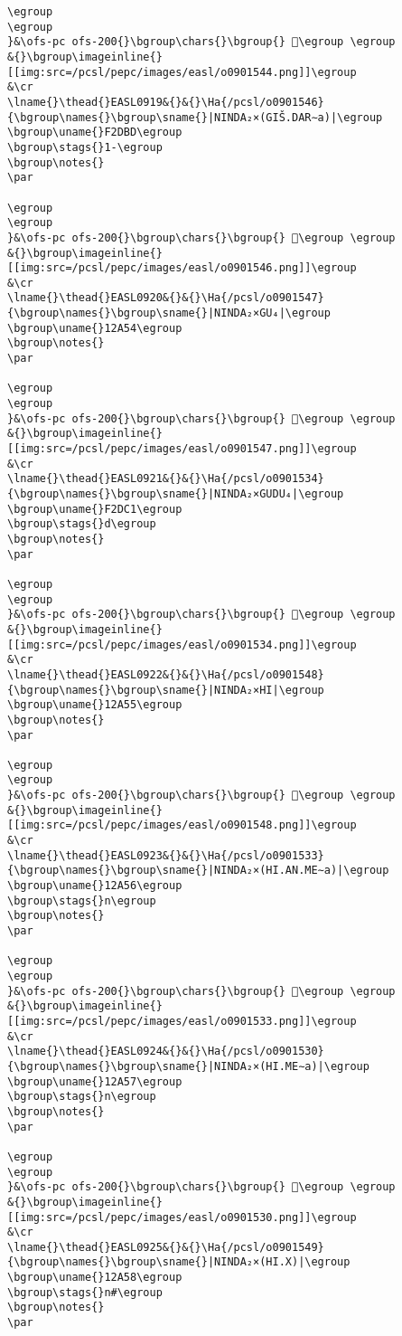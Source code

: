 \begin{verbatim}
\egroup
\egroup
}&\ofs-pc ofs-200{}\bgroup\chars{}\bgroup{} 𒩓\egroup \egroup
&{}\bgroup\imageinline{}[[img:src=/pcsl/pepc/images/easl/o0901544.png]]\egroup
&\cr
\lname{}\thead{}EASL0919&{}&{}\Ha{/pcsl/o0901546}{\bgroup\names{}\bgroup\sname{}|NINDA₂×(GIŠ.DAR∼a)|\egroup
\bgroup\uname{}F2DBD\egroup
\bgroup\stags{}1-\egroup
\bgroup\notes{}
\par 

\egroup
\egroup
}&\ofs-pc ofs-200{}\bgroup\chars{}\bgroup{} 󲶽\egroup \egroup
&{}\bgroup\imageinline{}[[img:src=/pcsl/pepc/images/easl/o0901546.png]]\egroup
&\cr
\lname{}\thead{}EASL0920&{}&{}\Ha{/pcsl/o0901547}{\bgroup\names{}\bgroup\sname{}|NINDA₂×GU₄|\egroup
\bgroup\uname{}12A54\egroup
\bgroup\notes{}
\par 

\egroup
\egroup
}&\ofs-pc ofs-200{}\bgroup\chars{}\bgroup{} 𒩔\egroup \egroup
&{}\bgroup\imageinline{}[[img:src=/pcsl/pepc/images/easl/o0901547.png]]\egroup
&\cr
\lname{}\thead{}EASL0921&{}&{}\Ha{/pcsl/o0901534}{\bgroup\names{}\bgroup\sname{}|NINDA₂×GUDU₄|\egroup
\bgroup\uname{}F2DC1\egroup
\bgroup\stags{}d\egroup
\bgroup\notes{}
\par 

\egroup
\egroup
}&\ofs-pc ofs-200{}\bgroup\chars{}\bgroup{} 󲷁\egroup \egroup
&{}\bgroup\imageinline{}[[img:src=/pcsl/pepc/images/easl/o0901534.png]]\egroup
&\cr
\lname{}\thead{}EASL0922&{}&{}\Ha{/pcsl/o0901548}{\bgroup\names{}\bgroup\sname{}|NINDA₂×HI|\egroup
\bgroup\uname{}12A55\egroup
\bgroup\notes{}
\par 

\egroup
\egroup
}&\ofs-pc ofs-200{}\bgroup\chars{}\bgroup{} 𒩕\egroup \egroup
&{}\bgroup\imageinline{}[[img:src=/pcsl/pepc/images/easl/o0901548.png]]\egroup
&\cr
\lname{}\thead{}EASL0923&{}&{}\Ha{/pcsl/o0901533}{\bgroup\names{}\bgroup\sname{}|NINDA₂×(HI.AN.ME∼a)|\egroup
\bgroup\uname{}12A56\egroup
\bgroup\stags{}n\egroup
\bgroup\notes{}
\par 

\egroup
\egroup
}&\ofs-pc ofs-200{}\bgroup\chars{}\bgroup{} 𒩖\egroup \egroup
&{}\bgroup\imageinline{}[[img:src=/pcsl/pepc/images/easl/o0901533.png]]\egroup
&\cr
\lname{}\thead{}EASL0924&{}&{}\Ha{/pcsl/o0901530}{\bgroup\names{}\bgroup\sname{}|NINDA₂×(HI.ME∼a)|\egroup
\bgroup\uname{}12A57\egroup
\bgroup\stags{}n\egroup
\bgroup\notes{}
\par 

\egroup
\egroup
}&\ofs-pc ofs-200{}\bgroup\chars{}\bgroup{} 𒩗\egroup \egroup
&{}\bgroup\imageinline{}[[img:src=/pcsl/pepc/images/easl/o0901530.png]]\egroup
&\cr
\lname{}\thead{}EASL0925&{}&{}\Ha{/pcsl/o0901549}{\bgroup\names{}\bgroup\sname{}|NINDA₂×(HI.X)|\egroup
\bgroup\uname{}12A58\egroup
\bgroup\stags{}n#\egroup
\bgroup\notes{}
\par 


\end{verbatim}
